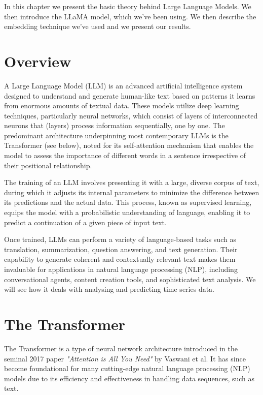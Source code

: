 In this chapter we present the basic theory behind Large Language Models. We then introduce the LLaMA model, which we've been using. We then describe the embedding technique we've used and we present our results.


\section{Overview}

A Large Language Model (LLM) is an advanced artificial intelligence system designed to understand and generate human-like text based on patterns it learns from enormous amounts of textual data.
These models utilize deep learning techniques, particularly neural networks, which consist of layers of interconnected neurons that (layers) process information sequentially, one by one.
The predominant architecture underpinning most contemporary LLMs is the Transformer (see below), noted for its self-attention mechanism that enables the model to assess the importance of different words in a sentence irrespective of their positional relationship.

The training of an LLM involves presenting it with a large, diverse corpus of text, during which it adjusts its internal parameters to minimize the difference between its predictions and the actual data. This process, known as supervised learning, equips the model with a probabilistic understanding of language, enabling it to predict a continuation of a given piece of input text.

Once trained, LLMs can perform a variety of language-based tasks such as translation, summarization, question answering, and text generation. Their capability to generate coherent and contextually relevant text makes them invaluable for applications in natural language processing (NLP), including conversational agents, content creation tools, and sophisticated text analysis. We will see how it deals with analysing and predicting time series data.


\section{The Transformer}

The Transformer is a type of neural network architecture introduced in the seminal 2017 paper \textit{"Attention is All You Need"} by Vaswani et al. It has since become foundational for many cutting-edge natural language processing (NLP) models due to its efficiency and effectiveness in handling data sequences, such as text.

